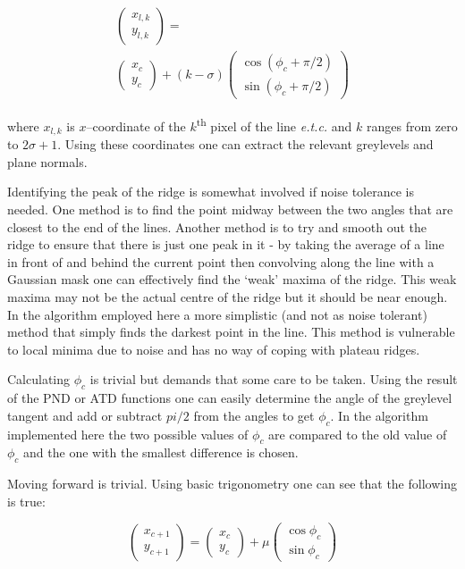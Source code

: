 \documentclass[11pt,a4paper]{article}
\begin{document}
\begin{multicols}{2}
		\begin{equation}
		\begin{split}
			\begin{pmatrix}
			x_{l,k} \\
			y_{l,k}
			\end{pmatrix}
			= \\
			\begin{pmatrix}
			x_c \\
			y_c
			\end{pmatrix}
			+ (k - \sigma)
			\begin{pmatrix}
			\cos{(\phi_c + \pi/2)} \\
			\sin{(\phi_c + \pi/2)}
			\end{pmatrix}
		\end{split}
		\end{equation}

		where $x_{l,k}$ is $x$--coordinate of the $k$\textsuperscript{th} pixel of the line \textit{e.t.c.} and $k$ ranges from zero to $2 \sigma + 1$. Using these coordinates one can extract the relevant greylevels and plane normals.

		Identifying the peak of the ridge is somewhat involved if noise tolerance is needed. One method is to find the point midway between the two angles that are closest to the end of the lines. Another method is to try and smooth out the ridge to ensure that there is just one peak in it - by taking the average of a line in front of and behind the current point then convolving along the line with a Gaussian mask one can effectively find the `weak' maxima of the ridge. This weak maxima may not be the actual centre of the ridge but it should be near enough. In the algorithm employed here a more simplistic (and not as noise tolerant) method that simply finds the darkest point in the line. This method is vulnerable to local minima due to noise and has no way of coping with plateau ridges.

		Calculating $\phi_c$ is trivial but demands that some care to be taken. Using the result of the PND or ATD functions one can easily determine the angle of the greylevel tangent and add or subtract $pi/2$ from the angles to get $\phi_c$. In the algorithm implemented here the two possible values of $\phi_c$ are compared to the old value of $\phi_c$ and the one with the smallest difference is chosen.

		Moving forward is trivial. Using basic trigonometry one can see that the following is true:

		\begin{equation}
			\begin{pmatrix}
			x_{c+1} \\
			y_{c+1}
			\end{pmatrix}
			=
			\begin{pmatrix}
			x_c \\
			y_c
			\end{pmatrix}
			+ \mu
			\begin{pmatrix}
			\cos{\phi_c} \\
			\sin{\phi_c}
			\end{pmatrix}
		\end{equation}


\end{multicols}
\end{document}
